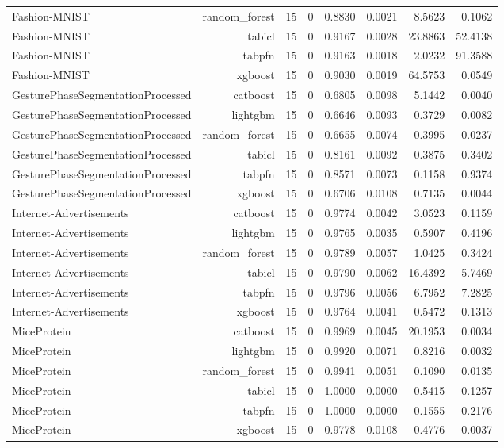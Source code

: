 \begin{table}[htbp]
\begin{tabular}{lrrrrrrr}
Fashion-MNIST & random\_forest & 15 & 0 & 0.8830 & 0.0021 & 8.5623 & 0.1062 \\
Fashion-MNIST & tabicl & 15 & 0 & 0.9167 & 0.0028 & 23.8863 & 52.4138 \\
Fashion-MNIST & tabpfn & 15 & 0 & 0.9163 & 0.0018 & 2.0232 & 91.3588 \\
Fashion-MNIST & xgboost & 15 & 0 & 0.9030 & 0.0019 & 64.5753 & 0.0549 \\
GesturePhaseSegmentationProcessed & catboost & 15 & 0 & 0.6805 & 0.0098 & 5.1442 & 0.0040 \\
GesturePhaseSegmentationProcessed & lightgbm & 15 & 0 & 0.6646 & 0.0093 & 0.3729 & 0.0082 \\
GesturePhaseSegmentationProcessed & random\_forest & 15 & 0 & 0.6655 & 0.0074 & 0.3995 & 0.0237 \\
GesturePhaseSegmentationProcessed & tabicl & 15 & 0 & 0.8161 & 0.0092 & 0.3875 & 0.3402 \\
GesturePhaseSegmentationProcessed & tabpfn & 15 & 0 & 0.8571 & 0.0073 & 0.1158 & 0.9374 \\
GesturePhaseSegmentationProcessed & xgboost & 15 & 0 & 0.6706 & 0.0108 & 0.7135 & 0.0044 \\
Internet-Advertisements & catboost & 15 & 0 & 0.9774 & 0.0042 & 3.0523 & 0.1159 \\
Internet-Advertisements & lightgbm & 15 & 0 & 0.9765 & 0.0035 & 0.5907 & 0.4196 \\
Internet-Advertisements & random\_forest & 15 & 0 & 0.9789 & 0.0057 & 1.0425 & 0.3424 \\
Internet-Advertisements & tabicl & 15 & 0 & 0.9790 & 0.0062 & 16.4392 & 5.7469 \\
Internet-Advertisements & tabpfn & 15 & 0 & 0.9796 & 0.0056 & 6.7952 & 7.2825 \\
Internet-Advertisements & xgboost & 15 & 0 & 0.9764 & 0.0041 & 0.5472 & 0.1313 \\
MiceProtein & catboost & 15 & 0 & 0.9969 & 0.0045 & 20.1953 & 0.0034 \\
MiceProtein & lightgbm & 15 & 0 & 0.9920 & 0.0071 & 0.8216 & 0.0032 \\
MiceProtein & random\_forest & 15 & 0 & 0.9941 & 0.0051 & 0.1090 & 0.0135 \\
MiceProtein & tabicl & 15 & 0 & 1.0000 & 0.0000 & 0.5415 & 0.1257 \\
MiceProtein & tabpfn & 15 & 0 & 1.0000 & 0.0000 & 0.1555 & 0.2176 \\
MiceProtein & xgboost & 15 & 0 & 0.9778 & 0.0108 & 0.4776 & 0.0037 \\

\end{tabular}
\end{table}

